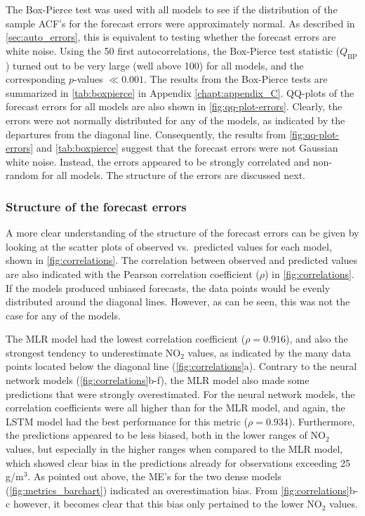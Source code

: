The Box-Pierce test was used with all models to see if the distribution of the sample ACF's for the forecast errors were approximately normal. As described in \cref{sec:auto_errors}, this is equivalent to testing whether the forecast errors are white noise. Using the 50 first autocorrelations, the Box-Pierce test statistic ($Q_{\text{BP}}$) turned out to be very large (well above 100) for all models, and the corresponding $p$-values $\ll0.001$. The results from the Box-Pierce tests are summarized in \cref{tab:boxpierce} in Appendix \ref{chapt:appendix_C}. QQ-plots of the forecast errors for all models are also shown in \cref{fig:qq-plot-errors}. Clearly, the errors were not normally distributed for any of the models, as indicated by the departures from the diagonal line. Consequently, the results from \cref{fig:qq-plot-errors} and \cref{tab:boxpierce} suggest that the forecast errors were not Gaussian white noise. Instead, the errors appeared to be strongly correlated and non-random for all models. The structure of the errors are discussed next.

\subsubsection{Structure of the forecast errors}
A more clear understanding of the structure of the forecast errors can be given by looking at the scatter plots of observed vs.\ predicted values for each model, shown in \cref{fig:correlations}. The correlation between observed and predicted values are also indicated with the Pearson correlation coefficient ($\rho$) in \cref{fig:correlations}. If the models produced unbiased forecasts, the data points would be evenly distributed around the diagonal lines. However, as can be seen, this was not the case for any of the models.


The MLR model had the lowest correlation coefficient ($\rho = 0.916$), and also the strongest tendency to underestimate NO$_2$ values, as indicated by the many data points located below the diagonal line (\cref{fig:correlations}a). Contrary to the neural network models (\cref{fig:correlations}b-f), the MLR model also made some predictions that were strongly overestimated. For the neural network models, the correlation coefficients were all higher than for the MLR model, and again, the LSTM model had the best performance for this metric ($\rho=0.934$). Furthermore, the predictions appeared to be less biased, both in the lower ranges of NO$_2$ values, but especially in the higher ranges when compared to the MLR model, which showed clear bias in the predictions already for observations exceeding 25 \textmugreek g/m$^3$. As pointed out above, the ME's for the two dense models (\cref{fig:metrics_barchart}) indicated an overestimation bias. From \cref{fig:correlations}b-c however, it becomes clear that this bias only pertained to the lower NO$_2$ values.   
 
